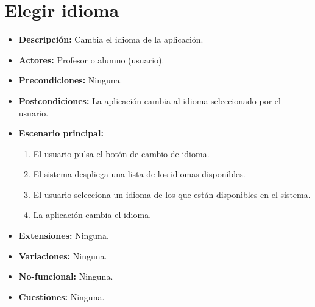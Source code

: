 \section{Elegir idioma}
\begin{itemize}
	\item \textbf{Descripción:} Cambia el idioma de la aplicación.
	\item \textbf{Actores:} Profesor o alumno (usuario).
	\item \textbf{Precondiciones:} Ninguna. %
	\item \textbf{Postcondiciones:} La aplicación cambia al idioma seleccionado por el usuario.
	\item \textbf{Escenario principal:}
	\begin{enumerate}
		\item El usuario pulsa el botón de cambio de idioma.
		\item El sistema despliega una lista de los idiomas disponibles.
		\item El usuario  selecciona un idioma de los que están disponibles en el sistema.
		\item La aplicación cambia el idioma.
	\end{enumerate}
	\item \textbf{Extensiones:} Ninguna.
	\item \textbf{Variaciones:} Ninguna.
	\item \textbf{No-funcional:} Ninguna.
	\item \textbf{Cuestiones:} Ninguna.
\end{itemize}

